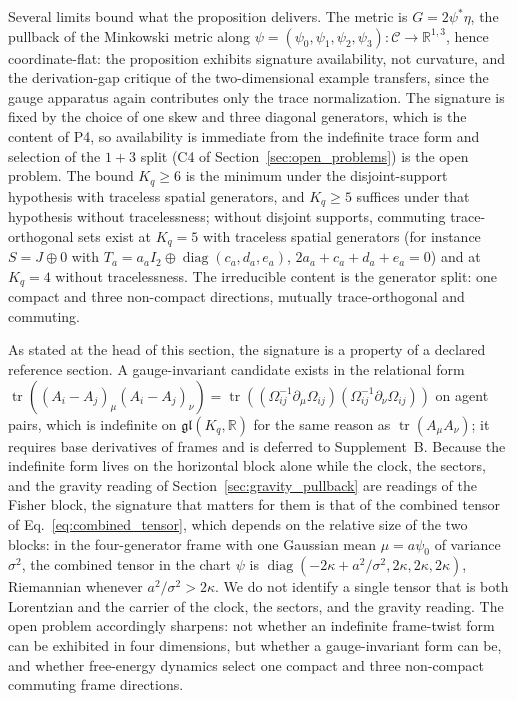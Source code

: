 Several limits bound what the proposition delivers. The metric is $G = 2\psi^*\eta$, the pullback of the Minkowski metric along $\psi = (\psi_0, \psi_1, \psi_2, \psi_3): \mathcal{C} \to \mathbb{R}^{1,3}$, hence coordinate-flat: the proposition exhibits signature availability, not curvature, and the derivation-gap critique of the two-dimensional example transfers, since the gauge apparatus again contributes only the trace normalization. The signature is fixed by the choice of one skew and three diagonal generators, which is the content of P4, so availability is immediate from the indefinite trace form and selection of the $1{+}3$ split (C4 of Section~\ref{sec:open_problems}) is the open problem. The bound $K_q \geq 6$ is the minimum under the disjoint-support hypothesis with traceless spatial generators, and $K_q \geq 5$ suffices under that hypothesis without tracelessness; without disjoint supports, commuting trace-orthogonal sets exist at $K_q = 5$ with traceless spatial generators (for instance $S = J \oplus 0$ with $T_a = a_a I_2 \oplus \operatorname{diag}(c_a, d_a, e_a)$, $2a_a + c_a + d_a + e_a = 0$) and at $K_q = 4$ without tracelessness. The irreducible content is the generator split: one compact and three non-compact directions, mutually trace-orthogonal and commuting.

As stated at the head of this section, the signature is a property of a declared reference section. A gauge-invariant candidate exists in the relational form $\operatorname{tr}((A_i - A_j)_\mu(A_i - A_j)_\nu) = \operatorname{tr}((\Omega_{ij}^{-1}\partial_\mu\Omega_{ij})(\Omega_{ij}^{-1}\partial_\nu\Omega_{ij}))$ on agent pairs, which is indefinite on $\mathfrak{gl}(K_q,\mathbb{R})$ for the same reason as $\operatorname{tr}(A_\mu A_\nu)$; it requires base derivatives of frames and is deferred to Supplement~B. Because the indefinite form lives on the horizontal block alone while the clock, the sectors, and the gravity reading of Section~\ref{sec:gravity_pullback} are readings of the Fisher block, the signature that matters for them is that of the combined tensor of Eq.~\eqref{eq:combined_tensor}, which depends on the relative size of the two blocks: in the four-generator frame with one Gaussian mean $\mu = a\psi_0$ of variance $\sigma^2$, the combined tensor in the chart $\psi$ is $\operatorname{diag}(-2\kappa + a^2/\sigma^2, 2\kappa, 2\kappa, 2\kappa)$, Riemannian whenever $a^2/\sigma^2 > 2\kappa$. We do not identify a single tensor that is both Lorentzian and the carrier of the clock, the sectors, and the gravity reading. The open problem accordingly sharpens: not whether an indefinite frame-twist form can be exhibited in four dimensions, but whether a gauge-invariant form can be, and whether free-energy dynamics select one compact and three non-compact commuting frame directions.

